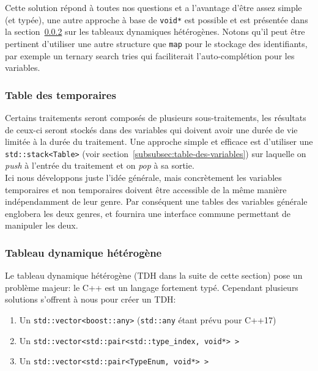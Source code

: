 \documentclass[french]{article}
\begin{document}
				Cette solution répond à toutes nos questions et a l'avantage d'être assez simple (et typée), une autre approche à base de \texttt{void*} est possible et est présentée dans la section~\ref{subsubsec:tableau-dynamique-heterogene} sur les tableaux dynamiques hétérogènes. Notons qu'il peut être pertinent d'utiliser une autre structure que \texttt{map} pour le stockage des identifiants, par exemple un ternary search tries qui faciliterait l'auto-complétion pour les variables.
			
			\subsubsection{Table des temporaires}
				\label{subsubsec:table-des-temporaires}
				Certains traitements seront composés de plusieurs sous-traitements, les résultats de ceux-ci seront stockés dans des variables qui doivent avoir une durée de vie limitée à la durée du traitement. Une approche simple et efficace est d'utiliser une \texttt{std::stack<Table>} (voir section~\ref{subsubsec:table-des-variables}) sur laquelle on \textit{push} à l'entrée du traitement et on \textit{pop} à sa sortie.\\
				
				Ici nous développons juste l'idée générale, mais concrètement les variables temporaires et non temporaires doivent être accessible de la même manière indépendamment de leur genre. Par conséquent une tables des variables générale englobera les deux genres, et fournira une interface commune permettant de manipuler les deux.
				
			\subsubsection{Tableau dynamique hétérogène}
				\label{subsubsec:tableau-dynamique-heterogene}
				Le tableau dynamique hétérogène (TDH dans la suite de cette section) pose un problème majeur: le C++ est un langage fortement typé. Cependant plusieurs solutions s'offrent à nous pour créer un TDH:
				
				\begin{enumerate}
					\item Un \texttt{std::vector<boost::any>} (\texttt{std::any} étant prévu pour C++17)
					\item Un \texttt{std::vector<std::pair<std::type\_index, void*> >}
					\item Un \texttt{std::vector<std::pair<TypeEnum, void*> >}
				\end{enumerate}
				
\end{document}
